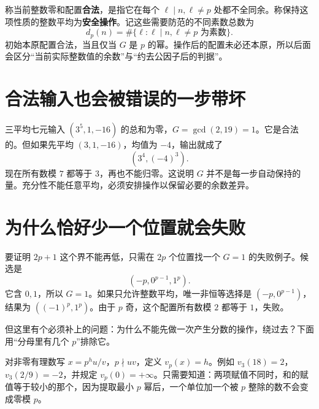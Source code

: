 \documentclass[11pt,a4paper,oneside,openany]{book}
\theoremstyle{definition}
\numberwithin{equation}{chapter}
\begin{document}
称当前整数零和配置\textbf{合法}，是指它在每个 $\ell\mid n,\ell\ne p$ 处都不全同余。称保持这项性质的整数平均为\textbf{安全操作}。记这些需要防范的不同素数总数为
\[d_p(n)=\#\{\ell:\ell\mid n,\ell\ne p\text{ 为素数}\}.
\]
初始本原配置合法，当且仅当 $G$ 是 $p$ 的幂。操作后的配置未必还本原，所以后面会区分“当前实际整数值的余数”与“约去公因子后的判据”。

\section{合法输入也会被错误的一步带坏}
三平均七元输入 $(3^5,1,-16)$ 的总和为零，$G=\gcd(2,19)=1$。它是合法的。但如果先平均 $(3,1,-16)$，均值为 $-4$，输出就成了
\[(3^4,(-4)^3).
\]
现在所有数模 $7$ 都等于 $3$，再也不能归零。这说明 $G$ 并不是每一步自动保持的量。充分性不能任意平均，必须安排操作以保留必要的余数差异。

\section{为什么恰好少一个位置就会失败}
要证明 $2p+1$ 这个界不能再低，只需在 $2p$ 个位置找一个 $G=1$ 的失败例子。候选是
\[(-p,0^{p-1},1^p).
\]
它含 $0,1$，所以 $G=1$。如果只允许整数平均，唯一非恒等选择是 $(-p,0^{p-1})$，结果为 $((-1)^p,1^p)$。由于 $p$ 奇，这个配置所有数模 $2$ 都等于 $1$，失败。

但这里有个必须补上的问题：为什么不能先做一次产生分数的操作，绕过去？下面用“分母里有几个 $p$”排除它。

对非零有理数写 $x=p^h u/v$，$p\nmid uv$，定义 $v_p(x)=h$。例如 $v_3(18)=2$，$v_3(2/9)=-2$，并规定 $v_p(0)=+\infty$。只需要知道：两项赋值不同时，和的赋值等于较小的那个，因为提取最小 $p$ 幂后，一个单位加一个被 $p$ 整除的数不会变成零模 $p$。
\end{document}
